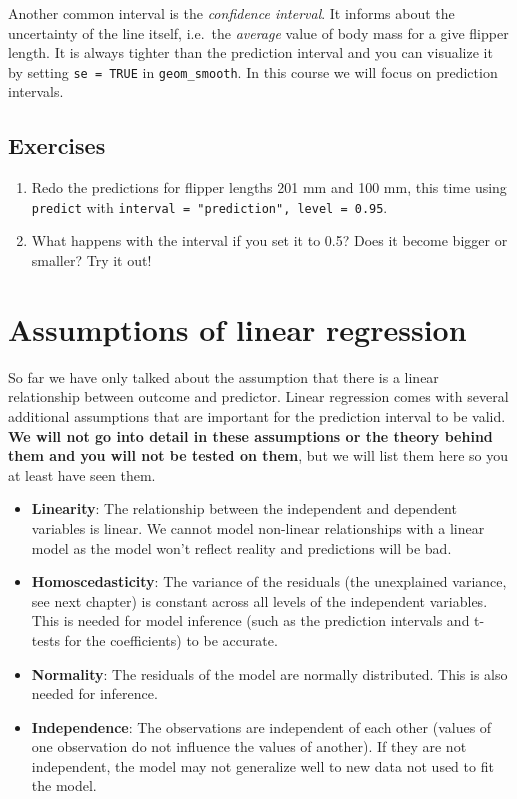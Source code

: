 \documentclass[
  letterpaper,
  DIV=11,
  numbers=noendperiod]{scrreprt}
\providecommand{\tightlist}{%
  \setlength{\itemsep}{0pt}\setlength{\parskip}{0pt}}\usepackage{longtable,booktabs,array}
\begin{document}
{Another common interval is the \emph{confidence interval}. It informs
about the uncertainty of the line itself, i.e.~the \emph{average} value
of body mass for a give flipper length. It is always tighter than the
prediction interval and you can visualize it by setting
\texttt{se\ =\ TRUE} in \texttt{geom\_smooth}. In this course we will
focus on prediction intervals.}

\subsection{Exercises}\label{exercises-15}

\begin{enumerate}
\def\labelenumi{\arabic{enumi}.}
\tightlist
\item
  Redo the predictions for flipper lengths 201 mm and 100 mm, this time
  using \texttt{predict} with
  \texttt{interval\ =\ "prediction",\ level\ =\ 0.95}.
\item
  What happens with the interval if you set it to 0.5? Does it become
  bigger or smaller? Try it out!
\end{enumerate}

\section{Assumptions of linear
regression}\label{assumptions-of-linear-regression}

So far we have only talked about the assumption that there is a linear
relationship between outcome and predictor. Linear regression comes with
several additional assumptions that are important for the prediction
interval to be valid. \textbf{We will not go into detail in these
assumptions or the theory behind them and you will not be tested on
them}, but we will list them here so you at least have seen them.

\begin{itemize}
\tightlist
\item
  \textbf{Linearity}: The relationship between the independent and
  dependent variables is linear. We cannot model non-linear
  relationships with a linear model as the model won't reflect reality
  and predictions will be bad.
\item
  \textbf{Homoscedasticity}: The variance of the residuals (the
  unexplained variance, see next chapter) is constant across all levels
  of the independent variables. This is needed for model inference (such
  as the prediction intervals and t-tests for the coefficients) to be
  accurate.
\item
  \textbf{Normality}: The residuals of the model are normally
  distributed. This is also needed for inference.
\item
  \textbf{Independence}: The observations are independent of each other
  (values of one observation do not influence the values of another). If
  they are not independent, the model may not generalize well to new
  data not used to fit the model.
\end{itemize}
\end{document}
